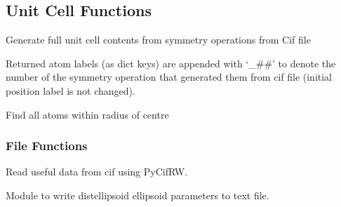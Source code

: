 \documentclass[a4paper,10pt,openany, oneside]{sphinxmanual}
\begin{document}
\subsection{Unit Cell Functions}
\label{api_reference:unit-cell-functions}

\begin{fulllineitems}
\label{api_reference:distellipsoid.readcoords.makeP1cell}
Generate full unit cell contents from symmetry operations from Cif file

Returned atom labels (as dict keys) are appended with `\_\#\#' to denote the number
of the symmetry operation that generated them from cif file (initial position
label is not changed).

\end{fulllineitems}


\begin{fulllineitems}
\label{api_reference:distellipsoid.readcoords.findligands}
Find all atoms within radius of centre

\end{fulllineitems}



\subsubsection{File Functions}
\label{api_reference:file-functions}

\begin{fulllineitems}
\label{api_reference:distellipsoid.readcoords.readcif}
Read useful data from cif using PyCifRW.

\end{fulllineitems}

\label{api_reference:module-distellipsoid.writeproperties}
Module to write distellipsoid ellipsoid parameters to text file.
\end{document}
